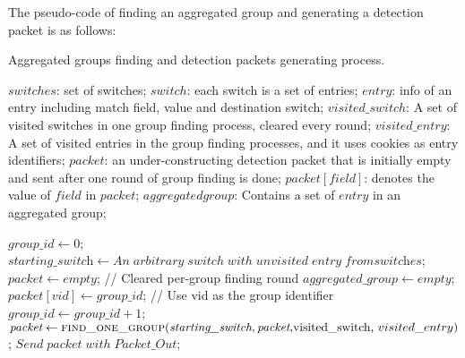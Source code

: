 The pseudo-code of finding an aggregated group and generating a detection packet is as follows:

\begin {tcolorbox}[blanker,float=tbp,
grow to left by=1cm, grow to right by=1cm]
\label{pseudo}
\begin{algorithm}[H]

  \caption{Aggregated groups finding and detection packets generating process.}
  \begin{algorithmic}[1]
    \Require
      $switches$: set of switches;  \newline
      $switch$: each switch is a set of entries;  \newline
      $entry$: info of an entry including match field, value and destination switch;  \newline
      $visited\_switch$: A set of visited switches in one group finding process, cleared every round;  \newline
      $visited\_entry$: A set of visited entries in the group finding processes, and it uses cookies as entry identifiers; \newline
      $packet$: an under-constructing detection packet that is initially empty and sent after one round of group finding is done; \newline
      $packet[field]$: denotes the value of $field$ in $packet$; \newline
      $aggregated group$: Contains a set of $entry$ in an aggregated group; \newline

      
      \State $\textit{group\_id} \gets 0$;
            \State $\textit{starting\_switch} \gets An\;arbitrary\;switch\;with\;unvisited\;entry\;from\textit{switches}$;
            \State $\textit{packet} \gets empty$;   // Cleared per-group finding round
            \State $\textit{aggregated\_group} \gets empty$;
            \State $packet[vid] \gets \textit{group\_id}$;   // Use vid as the group identifier 
            \State $group\_id \gets \textit{group\_id} + 1$;
            \State $\textit{packet} \gets \Call{find\_one\_group}{\textit{starting\_switch}, \textit{packet}, $visited\_switch, $visited\_entry}$;
            \State $Send\;\textit{packet}\;with\;Packet\_Out$;
      \EndWhile
    \EndFunction
  \end{algorithmic}
\end{algorithm}
\end{tcolorbox}

